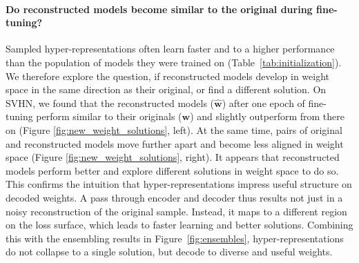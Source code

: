 \documentclass{article}
\begin{document}
\paragraph{Do reconstructed models become similar to the original during fine-tuning?}
Sampled hyper-representations often learn faster and to a higher performance than the population of models they were trained on (Table~\ref{tab:initialization}).
We therefore explore the question, if reconstructed models develop in weight space in the same direction as their original, or find a different solution.
On SVHN, we found that the reconstructed models ($\hat{\mathbf{w}}$) after one epoch of fine-tuning perform similar to their originals ($\mathbf{w}$) and slightly outperform from there on (Figure \ref{fig:new_weight_solutions}, left).
At the same time, pairs of original and reconstructed models move further apart and become less aligned in weight space (Figure \ref{fig:new_weight_solutions}, right).
It appears that reconstructed models perform better and explore different solutions in weight space to do so. 
This confirms the intuition that hyper-representations impress useful structure on decoded weights. 
A pass through encoder and decoder thus results not just in a noisy reconstruction of the original sample. 
Instead, it maps to a different region on the loss surface, which leads to faster learning and better solutions.
Combining this with the ensembling results in Figure~\ref{fig:ensembles}, hyper-representations do not collapse to a single solution, but decode to diverse and useful weights.

\end{document}
